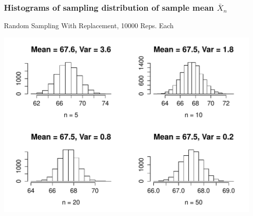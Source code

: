 \begin{frame}
\frametitle{Histograms of sampling distribution of sample mean $\bar{X}_n$}
\alert{Random Sampling With Replacement, 10000 Reps. Each}
\begin{center}
\includegraphics[scale = 0.55]{./images/height_samples}
\end{center}
\end{frame}
